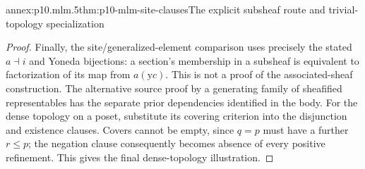 \begin{annexitem}{annex:p10.mlm.5}{thm:p10-mlm-site-clauses}{The explicit subsheaf route and trivial-topology specialization}
\begin{proof}
Finally, the site/generalized-element comparison uses precisely the stated
\(a\dashv i\) and Yoneda bijections: a section's membership in a subsheaf
is equivalent to factorization of its map from \(a(\mathrm yc)\).
This is not a proof of the associated-sheaf construction. The alternative
source proof by a generating family of sheafified representables has the
separate prior dependencies identified in the body. For the dense topology
on a poset, substitute its covering criterion into the disjunction and
existence clauses. Covers cannot be empty, since \(q=p\) must have a further
\(r\leq p\); the negation clause consequently becomes absence of every
positive refinement. This gives the final dense-topology illustration.
\end{proof}
\end{annexitem}

